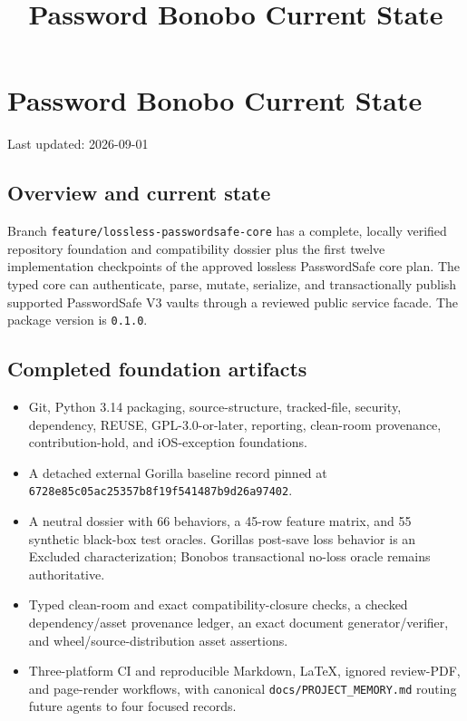 \documentclass[
  letterpaper,
]{article}
\title{Password Bonobo Current State}
\author{}
\date{}
\newcommand{\passthrough}[1]{#1}
\providecommand{\tightlist}{%
  \setlength{\itemsep}{0pt}\setlength{\parskip}{0pt}}
\begin{document}
\maketitle

{
\setcounter{tocdepth}{3}
\tableofcontents
}
\section{Password Bonobo Current State}\label{password-bonobo-current-state}

Last updated: 2026-09-01

\subsection{Overview and current state}\label{overview-and-current-state}

Branch \nolinkurl{feature/lossless-passwordsafe-core} has a complete, locally verified repository foundation and
compatibility dossier plus the first twelve implementation checkpoints of the approved lossless PasswordSafe core plan.
The typed core can authenticate, parse, mutate, serialize, and transactionally publish supported PasswordSafe V3 vaults
through a reviewed public service facade. The package version is \passthrough{\lstinline!0.1.0!}.

\subsection{Completed foundation artifacts}\label{completed-foundation-artifacts}

\begin{itemize}
\tightlist
\item
  Git, Python 3.14 packaging, source-structure, tracked-file, security, dependency, REUSE, GPL-3.0-or-later, reporting,
  clean-room provenance, contribution-hold, and iOS-exception foundations.
\item
  A detached external Gorilla baseline record pinned at \nolinkurl{6728e85c05ac25357b8f19f541487b9d26a97402}.
\item
  A neutral dossier with 66 behaviors, a 45-row feature matrix, and 55 synthetic black-box test oracles.
  Gorilla\textquotesingle s post-save loss behavior is an Excluded characterization; Bonobo\textquotesingle s
  transactional no-loss oracle remains authoritative.
\item
  Typed clean-room and exact compatibility-closure checks, a checked dependency/asset provenance ledger, an exact
  document generator/verifier, and wheel/source-distribution asset assertions.
\item
  Three-platform CI and reproducible Markdown, LaTeX, ignored review-PDF, and page-render workflows, with canonical
  \nolinkurl{docs/PROJECT_MEMORY.md} routing future agents to four focused records.
\end{itemize}
\end{document}
